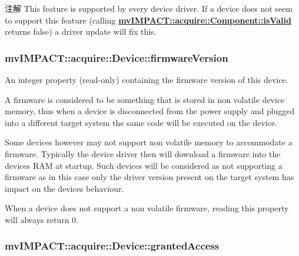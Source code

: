 \begin{DoxyNote}{注解}
This feature is supported by every device driver. If a device does not seem to support this feature (calling {\bfseries \hyperlink{classmv_i_m_p_a_c_t_1_1acquire_1_1_component_ac51e55e7e046101f3c6119d84123abd5}{mv\+I\+M\+P\+A\+C\+T\+::acquire\+::\+Component\+::is\+Valid}} returns false) a driver update will fix this. 
\end{DoxyNote}
\hypertarget{classmv_i_m_p_a_c_t_1_1acquire_1_1_device_a74abbd0bc1fda2dce54e28c6076f9528}{
\subsubsection[{firmware\+Version}]{ mv\+I\+M\+P\+A\+C\+T\+::acquire\+::\+Device\+::firmware\+Version}}\label{classmv_i_m_p_a_c_t_1_1acquire_1_1_device_a74abbd0bc1fda2dce54e28c6076f9528}


An integer property {\bfseries }(read-\/only) containing the firmware version of this device. 

A firmware is considered to be something that is stored in non volatile device memory, thus when a device is disconnected from the power supply and plugged into a different target system the same code will be executed on the device.

Some devices however may not support non volatile memory to accommodate a firmware. Typically the device driver then will download a firmware into the devices R\+A\+M at startup. Such devices will be considered as not supporting a firmware as in this case only the driver version present on the target system has impact on the devices behaviour.

When a device does not support a non volatile firmware, reading this property will always return 0. \hypertarget{classmv_i_m_p_a_c_t_1_1acquire_1_1_device_a1bafdfce12e0ea8b8f9fa0c3c36ab4bb}{
\subsubsection[{granted\+Access}]{ mv\+I\+M\+P\+A\+C\+T\+::acquire\+::\+Device\+::granted\+Access}}\label{classmv_i_m_p_a_c_t_1_1acquire_1_1_device_a1bafdfce12e0ea8b8f9fa0c3c36ab4bb}


